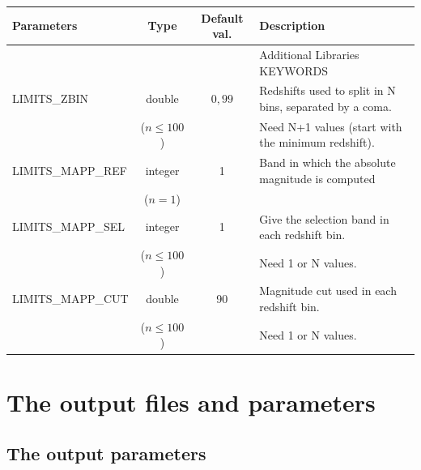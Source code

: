 \documentclass[12pt]{article}
\begin{document}
\begin{tabular}{lccl}
\\[0.5cm]
\textbf{Parameters}     & \textbf{Type}    & \textbf{Default val.} &  \textbf{Description}                                             \\[5pt]
\hline
                             &           &          &   Additional Libraries KEYWORDS    \\
%
\hline
%
LIMITS\_ZBIN         & double      &  $0,99$   &  Redshifts used to split in N bins, separated by a coma.  \\
                        & ($n\le 100$)&               &    Need N+1 values (start with the minimum redshift).          \\
%
LIMITS\_MAPP\_REF     &  integer         &     1    &  Band in which the absolute magnitude is computed \\
                        & ($n=1$)   &               &             \\
% 
LIMITS\_MAPP\_SEL     &  integer    &     1      &  Give the selection band in each redshift bin.    \\
                        & ($n \le 100$)         &   &   Need 1 or N values.          \\
%
LIMITS\_MAPP\_CUT  & double &  90       &  Magnitude cut used in each redshift bin. \\
                        & ($n \le 100$)       &      &    Need 1 or N values. \\
\hline
\hline
\end{tabular}
%  



%
\newpage
\section{The output files and parameters } 

\subsection{The output parameters}
\end{document}
